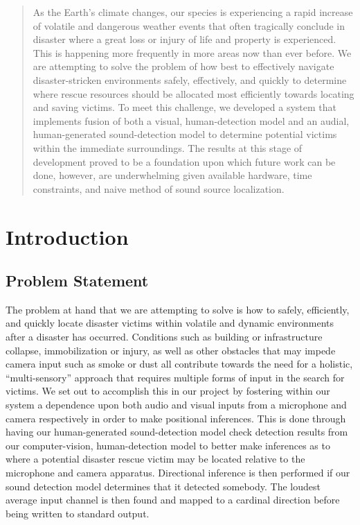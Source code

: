 \documentclass{article}
\author{
  Duggan, WIll\\
  \texttt{dwduggan@mail.sc.edu}
  \and
  Lewis, Cole\\
  \texttt{lewiscg@mail.sc.edu}
  \and
  Mallari, Daniella\\
  \texttt{dmallari@mail.sc.edu}
}
\title{}
\begin{document}

\begin{abstract}
As the Earth’s climate changes, our species is experiencing a rapid increase of volatile and dangerous weather events that often tragically conclude in disaster where a great loss or injury of life and property is experienced. This is happening more frequently in more areas now than ever before. We are attempting to solve the problem of how best to effectively navigate disaster-stricken environments safely, effectively, and quickly to determine where rescue resources should be allocated most efficiently towards locating and saving victims. To meet this challenge, we developed a system that implements fusion of both a visual, human-detection model and an audial, human-generated sound-detection model to determine potential victims within the immediate surroundings. The results at this stage of development proved to be a foundation upon which future work can be done, however, are underwhelming given available hardware, time constraints, and naive method of sound source localization.

\end{abstract}

\section{Introduction}
\subsection{Problem Statement}
The problem at hand that we are attempting to solve is how to safely, efficiently, and quickly locate disaster victims within volatile and dynamic environments after a disaster has occurred. Conditions such as building or infrastructure collapse, immobilization or injury, as well as other obstacles that may impede camera input such as smoke or dust all contribute towards the need for a holistic, “multi-sensory” approach that requires multiple forms of input in the search for victims. We set out to accomplish this in our project by fostering within our system a dependence upon both audio and visual inputs from a microphone and camera respectively in order to make positional inferences. This is done through having our human-generated sound-detection model check detection results from our computer-vision, human-detection model to better make inferences as to where a potential disaster rescue victim may be located relative to the microphone and camera apparatus. Directional inference is then performed if our sound detection model determines that it detected somebody. The loudest average input channel is then found and mapped to a cardinal direction before being written to standard output.
\end{document}
